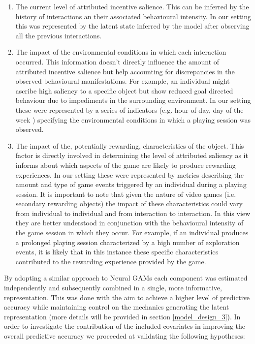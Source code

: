 \begin{enumerate}
    \item The current level of attributed incentive salience. This can be inferred by the history of interactions an their associated behavioural intensity. In our setting this was represented by the latent state inferred by the model after observing all the previous interactions.
    \item The impact of the environmental conditions in which each interaction occurred. This information doesn't directly influence the amount of attributed incentive salience but help accounting for discrepancies in the observed behavioural manifestations. For example, an individual might ascribe high saliency to a specific object but show reduced goal directed behaviour due to impediments in the surrounding environment. In our setting these were represented by a series of indicators (e.g. hour of day, day of the week ) specifying the environmental conditions in which a playing session was observed.
    \item The impact of the, potentially rewarding, characteristics of the object. This factor is directly involved in determining the level of attributed saliency as it informs about which aspects of the game are likely to produce rewarding experiences. In our setting these were represented by metrics describing the amount and type of game events triggered by an individual during a playing session. It is important to note that given the nature of video games (i.e. secondary rewarding objects) the impact of these characteristics could vary from individual to individual and from interaction to interaction. In this view they are better understood in conjunction with the behavioural intensity of the game session in which they occur. For example, if an individual produces a prolonged playing session characterized by a high number of exploration events, it is likely that in this instance these specific characteristics contributed to the rewarding experience provided by the game.
\end{enumerate}
By adopting a similar approach to Neural GAMs \cite{agarwal2021neural} each component was estimated independently and subsequently combined in a single, more informative, representation. This was done with the aim to achieve a higher level of predictive accuracy while maintaining control on the mechanics generating the latent representation (more details will be provided in section \ref{model_design_3}). In order to investigate the contribution of the included covariates in improving the overall predictive accuracy we proceeded at validating the following hypotheses:
